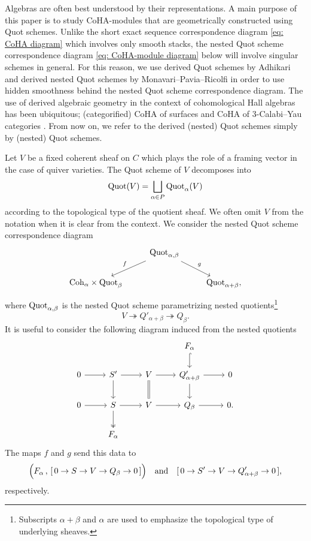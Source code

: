 \documentclass[10pt]{amsart}
\newcommand{\Quot}{\textnormal{Quot}}
\newcommand{\Coh}{\textnormal{Coh}}
\newcommand{\+}{{}^+}
\theoremstyle{definition}
\theoremstyle {definition}
\theoremstyle {definition}
\begin{document}
Algebras are often best understood by their representations. A main purpose of this paper is to study CoHA-modules that are geometrically constructed using Quot schemes. Unlike the short exact sequence correspondence diagram \eqref{eq: CoHA diagram} which involves only smooth stacks, the nested Quot scheme correspondence diagram \eqref{eq: CoHA-module diagram} below will involve singular schemes in general. For this reason, we use derived Quot schemes by Adhikari \cite{Adhikari} and derived nested Quot schemes by Monavari--Pavia--Ricolfi \cite{Monavari-Pavia-Ricolfi} in order to use hidden smoothness behind the nested Quot scheme correspondence diagram. The use of derived algebraic geometry in the context of cohomological Hall algebras has been ubiquitous; (categorified) CoHA of surfaces \cite{Kapranov-Vasserot, Sala-Schiffmann, Porta-Sala} and CoHA of 3-Calabi--Yau categories \cite{Kinjo-Park-Safronov}. From now on, we refer to the derived (nested) Quot schemes simply by (nested) Quot schemes.

Let $V$ be a fixed coherent sheaf on $C$ which plays the role of a framing vector in the case of quiver varieties. The Quot scheme of $V$ decomposes into  
$$\Quot(V)=\bigsqcup_{\alpha\in P}\Quot_{\alpha}(V)
$$
according to the topological type of the quotient sheaf. We often omit $V$ from the notation when it is clear from the context. We consider the nested Quot scheme correspondence diagram 
\begin{equation}\label{eq: CoHA-module diagram}
\begin{tikzcd}
  & \Quot_{\alpha,\beta} \arrow[ld, "f"'] \arrow[rd, "g"] &   \\
\Coh_\alpha\times \Quot_\beta &                                    & \Quot_{\alpha+\beta},
\end{tikzcd}
\end{equation}
where $\Quot_{\alpha,\beta}$ is the nested Quot scheme parametrizing nested quotients\footnote{Subscripts $\alpha+\beta$ and $\alpha$ are used to emphasize the topological type of underlying sheaves. }
$$V\twoheadrightarrow Q'_{\alpha+\beta}\twoheadrightarrow Q_\beta. 
$$
It is useful to consider the following diagram induced from the nested quotients
\begin{equation}\label{eq: nested Quot}
\begin{tikzcd}
            &                                  &                       & F_\alpha \arrow[d, hook]     &   \\
0 \arrow[r] & S' \arrow[r] \arrow[d]            & V \arrow[r] \arrow[d, equal] & Q'_{\alpha+\beta} \arrow[r] \arrow[d] & 0 \\
0 \arrow[r] & S \arrow[d, two heads] \arrow[r] & V \arrow[r]           & Q_\beta \arrow[r]           & 0. \\
            & F_\alpha                                &                       &                       &  
\end{tikzcd}
\end{equation}
The maps $f$ and $g$ send this data to 
$$\Big(F_\alpha\,,\,[\,0\rightarrow S\rightarrow V\rightarrow Q_\beta\rightarrow 0\,]\Big)
\quad\textnormal{and}\quad 
[\,0\rightarrow S'\rightarrow V\rightarrow Q'_{\alpha+\beta}\rightarrow 0\,],$$
respectively. 
\end{document}
